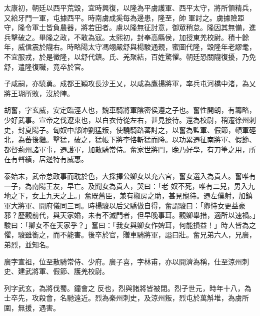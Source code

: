 \begin{pinyinscope}
 太康初，朝廷以西平荒毀，宜時興復，以隆為平虜護軍、西平太守，將所領精兵，又給牙門一軍，屯據西平。時南虜成奚每為邊患，隆至，帥
 軍討之。虜據險距守，隆令軍士皆負農器，將若田者。虜以隆無征討意，御眾稍怠。隆因其無備，進兵擊破之。畢隆之政，不敢為寇。太熙初，封奉高縣侯，加授東羌校尉。積十餘年，威信震於隴右。時略陽太守馮翊嚴舒與楊駿通親，蜜圖代隆，毀隆年老謬耄，不宜服戎，於是徵隆，以舒代鎮。氏、羌聚結，百姓驚懼。朝廷恐關隴復擾，乃免舒，遣隆復職，竟卒於官。



 子咸嗣，亦驍勇。成都王穎攻長沙王乂，以咸為鷹揚將軍，率兵屯河橋中渚，為乂將王瑚所敗，沒於陣。



 胡奮，字玄威，安定臨涇人也，魏車騎將軍陰密侯遵之子也。奮性開朗，有籌略，少好武事。宣帝之伐遼東也，以白衣侍從左右，甚見接待。還為校尉，稍遷徐州刺史，封夏陽子。匈奴中部帥劉猛叛，使驍騎路蕃討之，以奮為監軍、假節，頓軍硜北，為蕃後繼。擊猛，破之，猛帳下將李恪斬猛而降。以功累遷征南將軍、假節、都督荊州諸軍事，遷護軍，加散騎常侍。奮家世將門，晚乃好學，有刀筆之用，所在有聲績，居邊特有威惠。



 泰始末，武帝怠政事而耽於色，大採擇公卿女以充六宮，奮女選入為貴人。奮唯有一子，為南陽王友，早亡。及聞女為貴人，哭曰：「老
 奴不死，唯有二兒，男入九地之下，女上九天之上。」奮既舊臣，兼有椒房之助，甚見寵待。遷左僕射，加鎮軍大將軍、開府儀同三司。時楊駿以后父驕傲自得，奮謂駿曰：「卿恃女更益豪邪？歷觀前代，與天家婚，未有不滅門者，但早晚事耳。觀卿舉措，適所以速禍。」駿曰：「卿女不在天家乎？」奮曰：「我女與卿女作婢耳，何能損益！」時人皆為之懼，駿雖銜之，而不能害。後卒於官，贈車騎將軍，謚曰壯。奮兄弟六人，兄廣，弟烈，並知名。



 廣字宣祖，位至散騎常侍、少府。廣子喜，字林甫，亦以開濟為稱，仕至涼州刺史、建武將軍、假節、護羌校尉。



 列字武玄，為將伐蜀。鐘會之
 反也，烈與諸將皆被閉。烈子世元，時年十八，為士卒先，攻殺會，名馳遠近。烈為秦州刺史，及涼州叛，烈屯於萬斛堆，為虜所圍，無援，遇害。




\end{pinyinscope}
